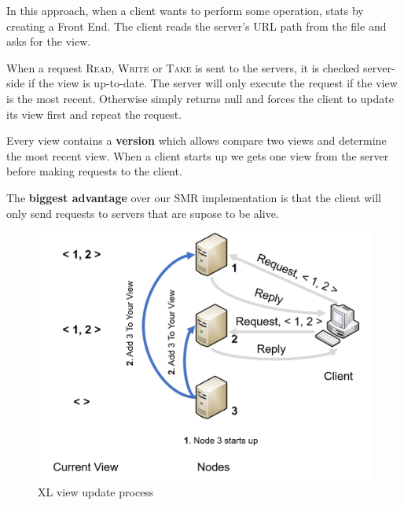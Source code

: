 \documentclass[times, 10pt,twocolumn]{article}
\begin{document}
In this approach, when a client wants to perform some operation, stats by creating
a Front End. The client reads the server's URL path from the file and asks for
the view.

When a request \textsc{Read}, \textsc{Write} or \textsc{Take} is sent to the servers,
it is checked server-side if the view is up-to-date.
The server will only execute the request if the view is the most recent. Otherwise
simply returns null and forces the client to update its view first and repeat the
request.

Every view contains a \textbf{version} which allows compare two views and determine the
most recent view. When a client starts up we gets one view from the server before
making requests to the client.

The \textbf{biggest advantage} over our SMR implementation is that the client will only
send requests to servers that are supose to be alive.

 


\begin{figure}
   \includegraphics[width=\linewidth]{xl_join1.png}
   \caption{XL view update process}
   \label{fig:xl_join1}
 \end{figure}
\end{document}
